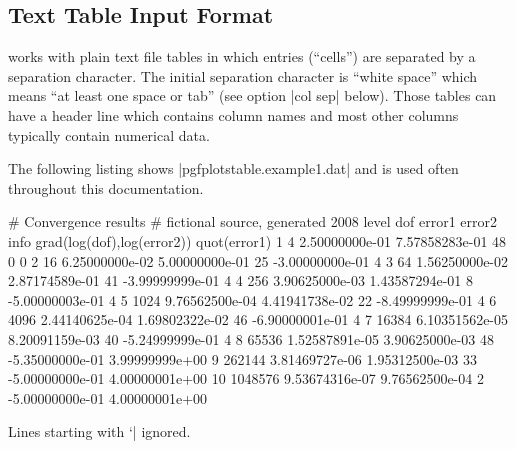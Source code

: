 \subsection{Text Table Input Format}

\PGFPlotstable{} works with plain text file tables in which entries (``cells'')
are separated by a separation character. The initial separation character is
``white space'' which means ``at least one space or tab'' (see option |col sep|
below). Those tables can have a header line which contains column names and
most other columns typically contain numerical data.

\noindent The following listing shows |pgfplotstable.example1.dat| and is used
often throughout this documentation.
%
\begin{codeexample}
# Convergence results
# fictional source, generated 2008
level    dof      error1            error2   info     grad(log(dof),log(error2)) quot(error1)
1        4        2.50000000e-01    7.57858283e-01    48       0                 0
2        16       6.25000000e-02    5.00000000e-01    25       -3.00000000e-01   4
3        64       1.56250000e-02    2.87174589e-01    41       -3.99999999e-01   4
4        256      3.90625000e-03    1.43587294e-01    8        -5.00000003e-01   4
5        1024     9.76562500e-04    4.41941738e-02    22       -8.49999999e-01   4
6        4096     2.44140625e-04    1.69802322e-02    46       -6.90000001e-01   4
7        16384    6.10351562e-05    8.20091159e-03    40       -5.24999999e-01   4
8        65536    1.52587891e-05    3.90625000e-03    48       -5.35000000e-01   3.99999999e+00
9        262144   3.81469727e-06    1.95312500e-03    33       -5.00000000e-01   4.00000001e+00
10       1048576  9.53674316e-07    9.76562500e-04    2        -5.00000000e-01   4.00000001e+00
\end{codeexample}
%
Lines starting with `|%
ignored.

